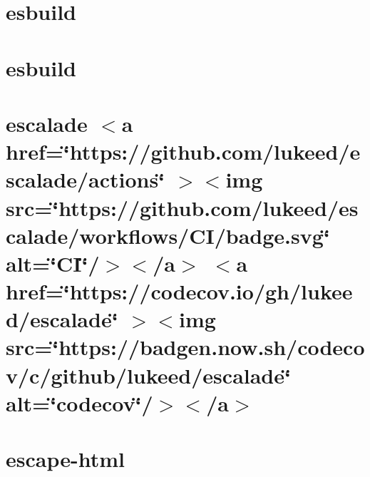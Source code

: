 \documentclass[twoside]{book}
\newcommand{\+}{\discretionary{\mbox{\scriptsize$\hookleftarrow$}}{}{}}
\begin{document}
\chapter{esbuild}
\label{md__c___users_vaishnavi_jadhav__desktop__developer_code_mean_stack_example_client_node_modules_esbuild_windows_64__r_e_a_d_m_e}

\chapter{esbuild}
\label{md__c___users_vaishnavi_jadhav__desktop__developer_code_mean_stack_example_client_node_modules_esbuild__r_e_a_d_m_e}

\chapter{escalade \texorpdfstring{$<$}{<}a href=\char`\"{}https\+://github.\+com/lukeed/escalade/actions\char`\"{} \texorpdfstring{$>$}{>}\texorpdfstring{$<$}{<}img src=\char`\"{}https\+://github.\+com/lukeed/escalade/workflows/\+CI/badge.\+svg\char`\"{} alt=\char`\"{}\+CI\char`\"{}/\texorpdfstring{$>$}{>}\texorpdfstring{$<$}{<}/a\texorpdfstring{$>$}{>} \texorpdfstring{$<$}{<}a href=\char`\"{}https\+://codecov.\+io/gh/lukeed/escalade\char`\"{} \texorpdfstring{$>$}{>}\texorpdfstring{$<$}{<}img src=\char`\"{}https\+://badgen.\+now.\+sh/codecov/c/github/lukeed/escalade\char`\"{} alt=\char`\"{}codecov\char`\"{}/\texorpdfstring{$>$}{>}\texorpdfstring{$<$}{<}/a\texorpdfstring{$>$}{>}}
\label{md__c___users_vaishnavi_jadhav__desktop__developer_code_mean_stack_example_client_node_modules_escalade_readme}

\chapter{escape-\/html}
\label{md__c___users_vaishnavi_jadhav__desktop__developer_code_mean_stack_example_client_node_modules_escape_html__readme}

\end{document}
